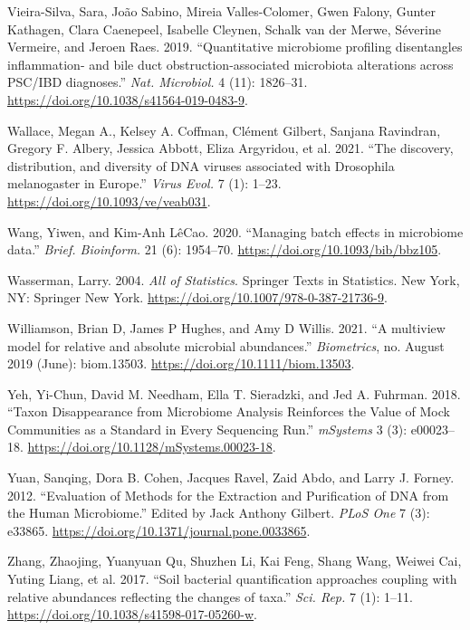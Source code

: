 \documentclass[
]{article}
\newlength{\cslhangindent}
\newlength{\cslentryspacingunit} %
\newenvironment{CSLReferences}[2] %
 {%
  \setlength{\parindent}{0pt}
  \ifodd #1
  \let\oldpar\par
  \def\par{\hangindent=\cslhangindent\oldpar}
  \fi
  \setlength{\parskip}{#2\cslentryspacingunit}
 }%
 {}
\begin{document}
\begin{CSLReferences}{1}{0}
\leavevmode{}%
Vieira-Silva, Sara, João Sabino, Mireia Valles-Colomer, Gwen Falony, Gunter Kathagen, Clara Caenepeel, Isabelle Cleynen, Schalk van der Merwe, Séverine Vermeire, and Jeroen Raes. 2019. {``{Quantitative microbiome profiling disentangles inflammation- and bile duct obstruction-associated microbiota alterations across PSC/IBD diagnoses}.''} \emph{Nat. Microbiol.} 4 (11): 1826--31. \url{https://doi.org/10.1038/s41564-019-0483-9}.

\leavevmode{}%
Wallace, Megan A., Kelsey A. Coffman, Clément Gilbert, Sanjana Ravindran, Gregory F. Albery, Jessica Abbott, Eliza Argyridou, et al. 2021. {``{The discovery, distribution, and diversity of DNA viruses associated with Drosophila melanogaster in Europe}.''} \emph{Virus Evol.} 7 (1): 1--23. \url{https://doi.org/10.1093/ve/veab031}.

\leavevmode{}%
Wang, Yiwen, and Kim-Anh LêCao. 2020. {``{Managing batch effects in microbiome data}.''} \emph{Brief. Bioinform.} 21 (6): 1954--70. \url{https://doi.org/10.1093/bib/bbz105}.

\leavevmode{}%
Wasserman, Larry. 2004. \emph{{All of Statistics}}. Springer Texts in Statistics. New York, NY: Springer New York. \url{https://doi.org/10.1007/978-0-387-21736-9}.

\leavevmode{}%
Williamson, Brian D, James P Hughes, and Amy D Willis. 2021. {``{A multiview model for relative and absolute microbial abundances}.''} \emph{Biometrics}, no. August 2019 (June): biom.13503. \url{https://doi.org/10.1111/biom.13503}.

\leavevmode{}%
Yeh, Yi-Chun, David M. Needham, Ella T. Sieradzki, and Jed A. Fuhrman. 2018. {``{Taxon Disappearance from Microbiome Analysis Reinforces the Value of Mock Communities as a Standard in Every Sequencing Run}.''} \emph{mSystems} 3 (3): e00023--18. \url{https://doi.org/10.1128/mSystems.00023-18}.

\leavevmode{}%
Yuan, Sanqing, Dora B. Cohen, Jacques Ravel, Zaid Abdo, and Larry J. Forney. 2012. {``{Evaluation of Methods for the Extraction and Purification of DNA from the Human Microbiome}.''} Edited by Jack Anthony Gilbert. \emph{PLoS One} 7 (3): e33865. \url{https://doi.org/10.1371/journal.pone.0033865}.

\leavevmode{}%
Zhang, Zhaojing, Yuanyuan Qu, Shuzhen Li, Kai Feng, Shang Wang, Weiwei Cai, Yuting Liang, et al. 2017. {``{Soil bacterial quantification approaches coupling with relative abundances reflecting the changes of taxa}.''} \emph{Sci. Rep.} 7 (1): 1--11. \url{https://doi.org/10.1038/s41598-017-05260-w}.

\end{CSLReferences}
\end{document}
